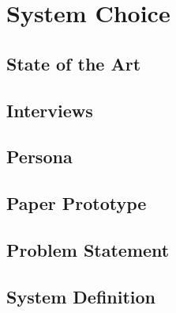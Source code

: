 \chapter{System Choice}


\section{State of the Art}
\label{StateOfTheArt}


\section{Interviews}





\section{Persona}


\section{Paper Prototype}


\section{Problem Statement}
\label{ProblemStatement}


\section{System Definition}

